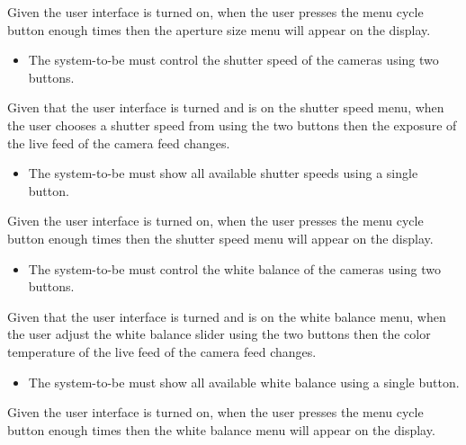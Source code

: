 Given the user interface is turned on, when the user presses the menu cycle button enough times then the aperture size menu will appear on the display.
\begin{itemize}
    \item The system-to-be must control the shutter speed of the cameras using two buttons.
\end{itemize}
Given that the user interface is turned and is on the shutter speed menu, when the user chooses a shutter speed from using the two buttons then the exposure of the live feed of the camera feed changes.
\begin{itemize}
    \item The system-to-be must show all available shutter speeds using a single button.
\end{itemize}
Given the user interface is turned on, when the user presses the menu cycle button enough times then the shutter speed menu will appear on the display.
\begin{itemize}
    \item The system-to-be must control the white balance of the cameras using two buttons.
\end{itemize}
Given that the user interface is turned and is on the white balance menu, when the user adjust the white balance slider using the two buttons then the color temperature of the live feed of the camera feed changes.
\begin{itemize}
    \item The system-to-be must show all available white balance using a single button.
\end{itemize}
Given the user interface is turned on, when the user presses the menu cycle button enough times then the white balance menu will appear on the display.